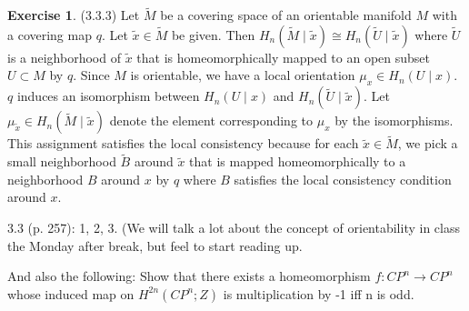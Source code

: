 \documentclass[12pt, psamsfonts]{amsart}
\theoremstyle{definition}
\newtheorem*{exer}{Exercise}
\theoremstyle{remark}
\numberwithin{equation}{section}
\begin{document}
\begin{exer}{(3.3.3)}
  Let $\tilde{M}$ be a covering space of an orientable manifold $M$ with a covering map $q$.
  Let $\tilde{x} \in \tilde{M}$ be given.
  Then $H_n(\tilde{M} \mid \tilde{x}) \cong H_n(\tilde{U} \mid \tilde{x})$ where $\tilde{U}$ is a neighborhood of $\tilde{x}$ that is homeomorphically mapped to an open subset $U \subset M$ by $q$.
  Since $M$ is orientable, we have a local orientation $\mu_x \in H_n(U \mid x)$.
  $q$ induces an isomorphism between $H_n(U \mid x)$ and $H_n(\tilde{U} \mid \tilde{x})$.
  Let $\mu_{\tilde{x}} \in H_n(\tilde{M} \mid \tilde{x})$ denote the element corresponding to $\mu_x$ by the isomorphisms.
  This assignment satisfies the local consistency because for each $\tilde{x} \in \tilde{M}$, we pick a small neighborhood $\tilde{B}$ around $\tilde{x}$ that is mapped homeomorphically to a neighborhood $B$ around $x$ by $q$ where $B$ satisfies the local consistency condition around $x$.
\end{exer}


3.3 (p. 257): 1, 2, 3. (We will talk a lot about the concept of orientability in class the Monday after break, but feel to start reading up.

And also the following: Show that there exists a homeomorphism $f: CP^n \to CP^n$ whose induced map on $H^{2n}(CP^n;Z)$ is multiplication by -1 iff n is odd.
\end{document}
